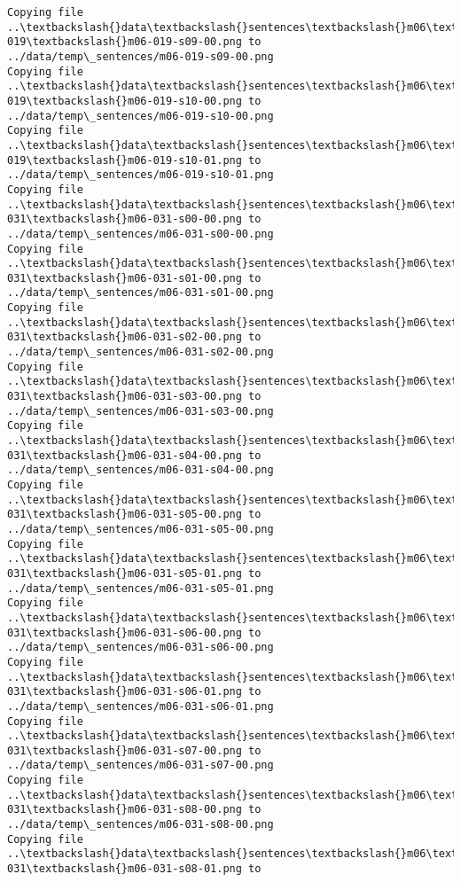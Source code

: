 \documentclass[11pt]{article}
\begin{document}
\begin{Verbatim}[commandchars=\\\{\}]
Copying file ..\textbackslash{}data\textbackslash{}sentences\textbackslash{}m06\textbackslash{}m06-019\textbackslash{}m06-019-s09-00.png to
../data/temp\_sentences/m06-019-s09-00.png
Copying file ..\textbackslash{}data\textbackslash{}sentences\textbackslash{}m06\textbackslash{}m06-019\textbackslash{}m06-019-s10-00.png to
../data/temp\_sentences/m06-019-s10-00.png
Copying file ..\textbackslash{}data\textbackslash{}sentences\textbackslash{}m06\textbackslash{}m06-019\textbackslash{}m06-019-s10-01.png to
../data/temp\_sentences/m06-019-s10-01.png
Copying file ..\textbackslash{}data\textbackslash{}sentences\textbackslash{}m06\textbackslash{}m06-031\textbackslash{}m06-031-s00-00.png to
../data/temp\_sentences/m06-031-s00-00.png
Copying file ..\textbackslash{}data\textbackslash{}sentences\textbackslash{}m06\textbackslash{}m06-031\textbackslash{}m06-031-s01-00.png to
../data/temp\_sentences/m06-031-s01-00.png
Copying file ..\textbackslash{}data\textbackslash{}sentences\textbackslash{}m06\textbackslash{}m06-031\textbackslash{}m06-031-s02-00.png to
../data/temp\_sentences/m06-031-s02-00.png
Copying file ..\textbackslash{}data\textbackslash{}sentences\textbackslash{}m06\textbackslash{}m06-031\textbackslash{}m06-031-s03-00.png to
../data/temp\_sentences/m06-031-s03-00.png
Copying file ..\textbackslash{}data\textbackslash{}sentences\textbackslash{}m06\textbackslash{}m06-031\textbackslash{}m06-031-s04-00.png to
../data/temp\_sentences/m06-031-s04-00.png
Copying file ..\textbackslash{}data\textbackslash{}sentences\textbackslash{}m06\textbackslash{}m06-031\textbackslash{}m06-031-s05-00.png to
../data/temp\_sentences/m06-031-s05-00.png
Copying file ..\textbackslash{}data\textbackslash{}sentences\textbackslash{}m06\textbackslash{}m06-031\textbackslash{}m06-031-s05-01.png to
../data/temp\_sentences/m06-031-s05-01.png
Copying file ..\textbackslash{}data\textbackslash{}sentences\textbackslash{}m06\textbackslash{}m06-031\textbackslash{}m06-031-s06-00.png to
../data/temp\_sentences/m06-031-s06-00.png
Copying file ..\textbackslash{}data\textbackslash{}sentences\textbackslash{}m06\textbackslash{}m06-031\textbackslash{}m06-031-s06-01.png to
../data/temp\_sentences/m06-031-s06-01.png
Copying file ..\textbackslash{}data\textbackslash{}sentences\textbackslash{}m06\textbackslash{}m06-031\textbackslash{}m06-031-s07-00.png to
../data/temp\_sentences/m06-031-s07-00.png
Copying file ..\textbackslash{}data\textbackslash{}sentences\textbackslash{}m06\textbackslash{}m06-031\textbackslash{}m06-031-s08-00.png to
../data/temp\_sentences/m06-031-s08-00.png
Copying file ..\textbackslash{}data\textbackslash{}sentences\textbackslash{}m06\textbackslash{}m06-031\textbackslash{}m06-031-s08-01.png to

\end{Verbatim}
\end{document}
